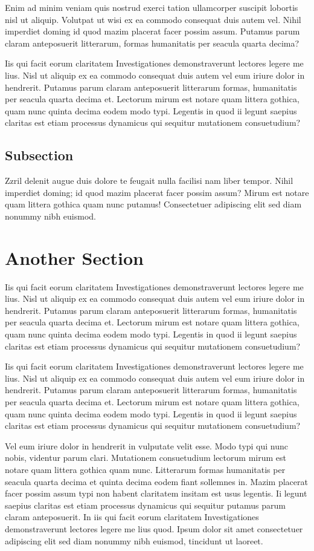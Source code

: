 \documentclass[a4paper,12pt]{scrartcl}
\begin{document}
Enim ad minim veniam quis nostrud exerci tation ullamcorper suscipit lobortis nisl ut aliquip. Volutpat ut wisi ex ea commodo consequat duis autem vel. Nihil imperdiet doming id quod mazim placerat facer possim assum. Putamus parum claram anteposuerit litterarum, formas humanitatis per seacula quarta decima?

Iis qui facit eorum claritatem Investigationes demonstraverunt lectores legere me lius. Nisl ut aliquip ex ea commodo consequat duis autem vel eum iriure dolor in hendrerit. Putamus parum claram anteposuerit litterarum formas, humanitatis per seacula quarta decima et. Lectorum mirum est notare quam littera gothica, quam nunc quinta decima eodem modo typi. Legentis in quod ii legunt saepius claritas est etiam processus dynamicus qui sequitur mutationem consuetudium?

\subsection{Subsection}
Zzril delenit augue duis dolore te feugait nulla facilisi nam liber tempor. Nihil imperdiet doming; id quod mazim placerat facer possim assum? Mirum est notare quam littera gothica quam nunc putamus! Consectetuer adipiscing elit sed diam nonummy nibh euismod.

\section{Another Section}
 Iis qui facit eorum claritatem Investigationes demonstraverunt lectores legere me lius. Nisl ut aliquip ex ea commodo consequat duis autem vel eum iriure dolor in hendrerit. Putamus parum claram anteposuerit litterarum formas, humanitatis per seacula quarta decima et. Lectorum mirum est notare quam littera gothica, quam nunc quinta decima eodem modo typi. Legentis in quod ii legunt saepius claritas est etiam processus dynamicus qui sequitur mutationem consuetudium?

 Iis qui facit eorum claritatem Investigationes demonstraverunt lectores legere me lius. Nisl ut aliquip ex ea commodo consequat duis autem vel eum iriure dolor in hendrerit. Putamus parum claram anteposuerit litterarum formas, humanitatis per seacula quarta decima et. Lectorum mirum est notare quam littera gothica, quam nunc quinta decima eodem modo typi. Legentis in quod ii legunt saepius claritas est etiam processus dynamicus qui sequitur mutationem consuetudium?

Vel eum iriure dolor in hendrerit in vulputate velit esse. Modo typi qui nunc nobis, videntur parum clari. Mutationem consuetudium lectorum mirum est notare quam littera gothica quam nunc. Litterarum formas humanitatis per seacula quarta decima et quinta decima eodem fiant sollemnes in. Mazim placerat facer possim assum typi non habent claritatem insitam est usus legentis. Ii legunt saepius claritas est etiam processus dynamicus qui sequitur putamus parum claram anteposuerit. In iis qui facit eorum claritatem Investigationes demonstraverunt lectores legere me lius quod. Ipsum dolor sit amet consectetuer adipiscing elit sed diam nonummy nibh euismod, tincidunt ut laoreet.
\end{document}
